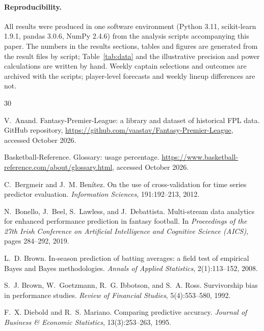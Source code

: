 \documentclass[11pt,a4paper]{article}
\begin{document}
\paragraph{Reproducibility.} All results were produced in one software environment (Python 3.11,
scikit-learn 1.9.1, pandas 3.0.6, NumPy 2.4.6) from the analysis scripts accompanying this paper.
The numbers in the results sections, tables and figures are generated from the result files by
script; Table~\ref{tab:data} and the illustrative precision and power calculations are written by
hand. Weekly captain selections and outcomes are archived with the scripts; player-level forecasts
and weekly lineup differences are not.

\begin{thebibliography}{30}
\setlength{\itemsep}{2pt}\small

V.~Anand.
\newblock Fantasy-Premier-League: a library and dataset of historical FPL data.
\newblock GitHub repository, \url{https://github.com/vaastav/Fantasy-Premier-League}, accessed October 2026.

Basketball-Reference.
\newblock Glossary: usage percentage.
\newblock \url{https://www.basketball-reference.com/about/glossary.html}, accessed October 2026.

C.~Bergmeir and J.~M. Ben\'itez.
\newblock On the use of cross-validation for time series predictor evaluation.
\newblock \emph{Information Sciences}, 191:192--213, 2012.

N.~Bonello, J.~Beel, S.~Lawless, and J.~Debattista.
\newblock Multi-stream data analytics for enhanced performance prediction in fantasy football.
\newblock In \emph{Proceedings of the 27th Irish Conference on Artificial Intelligence and Cognitive Science (AICS)}, pages 284--292, 2019.

L.~D. Brown.
\newblock In-season prediction of batting averages: a field test of empirical Bayes and Bayes methodologies.
\newblock \emph{Annals of Applied Statistics}, 2(1):113--152, 2008.

S.~J. Brown, W.~Goetzmann, R.~G. Ibbotson, and S.~A. Ross.
\newblock Survivorship bias in performance studies.
\newblock \emph{Review of Financial Studies}, 5(4):553--580, 1992.

F.~X. Diebold and R.~S. Mariano.
\newblock Comparing predictive accuracy.
\newblock \emph{Journal of Business \& Economic Statistics}, 13(3):253--263, 1995.


\end{thebibliography}
\end{document}
